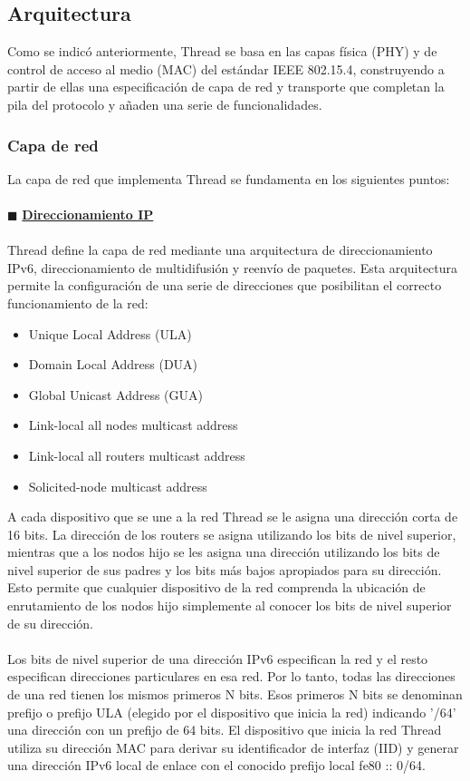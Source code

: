 \subsection{Arquitectura} %
Como se indicó anteriormente, Thread se basa en las capas física (PHY) y de control de acceso al medio (MAC) del estándar IEEE 802.15.4, construyendo a partir de ellas una especificación de capa de red y transporte que completan la pila del protocolo y añaden una serie de funcionalidades.
\subsubsection{Capa de red} %
La capa de red que implementa Thread se fundamenta en los siguientes puntos:
\\\\$\blacksquare$ {\underline{\textbf{Direccionamiento IP}}} %
\\\\Thread deﬁne la capa de red mediante una arquitectura de direccionamiento IPv6, direccionamiento de multidifusión y reenvío de paquetes. Esta arquitectura permite la configuración de una serie de direcciones que posibilitan el correcto funcionamiento de la red:
\begin{itemize}
\item Unique Local Address (ULA)
\item Domain Local Address (DUA)
\item Global Unicast Address (GUA)
\item Link-local all nodes multicast address
\item Link-local all routers multicast address
\item Solicited-node multicast address
\end{itemize}
\vspace{0.25cm}
A cada dispositivo que se une a la red Thread se le asigna una dirección corta de 16 bits. La dirección de los routers se asigna utilizando los bits de nivel superior, mientras que a los nodos hijo se les asigna una dirección utilizando los bits de nivel superior de sus padres y los bits más bajos apropiados para su dirección. Esto permite que cualquier dispositivo de la red comprenda la ubicación de enrutamiento de los nodos hijo simplemente al conocer los bits de nivel superior de su dirección.
\\\\
Los bits de nivel superior de una dirección IPv6 especifican la red y el resto especifican direcciones particulares en esa red. Por lo tanto, todas las direcciones de una red tienen los mismos primeros N bits. Esos primeros N bits se denominan prefijo o prefijo ULA (elegido por el dispositivo que inicia la red) indicando '/64' una dirección con un prefijo de 64 bits. El dispositivo que inicia la red Thread utiliza su dirección MAC para derivar su identificador de interfaz (IID) y generar una dirección IPv6 local de enlace con el conocido prefijo local fe80 :: 0/64.
\clearpage



